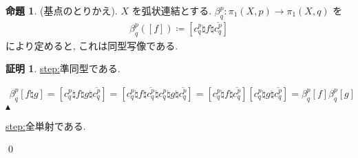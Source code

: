 \documentclass[10pt, fleqn, label-section=none]{bxjsarticle}
\theoremstyle{definition}
\newtheorem{prop}[dfn]{命題}
\newtheorem*{pf*}{証明}
\newcommand{\id}{\textrm{id}}
\renewcommand{\;}{\, ; \,}
\newenvironment{claim}[1]{\par\noindent\underline{step:}\space#1}{}
\newenvironment{claimproof}[1]{\par\noindent{($\because$)}\space#1}{\hfill $\blacktriangle $}
\begin{document}
\begin{prop}(基点のとりかえ). $X$ を弧状連結とする. $\beta_q^p : \pi_1 (X, p) \rightarrow \pi_1 (X, q)$ を
\begin{align*} \beta_q^p ([f]) \coloneqq [ c_q^p \natural f \natural \overline{c_q^p} ]\end{align*}
により定めると, これは同型写像である.
\end{prop}
\begin{pf*}

\begin{claim}
準同型である. 
\end{claim}
\begin{claimproof}
\begin{align*} \beta_q^p[f \natural g] = [ c_q^p \natural f \natural g \natural \overline{c_q^p} ] =
[ c_q^p \natural f \natural \overline{c_q^p} \natural c_q^p \natural g \natural \overline{c_q^p} ] =
[ c_q^p \natural f \natural \overline{c_q^p} ]  [c_q^p \natural g \natural \overline{c_q^p} ] = 
\beta_q^p [f ] \beta_q^p[g]
 \end{align*}
\end{claimproof}

\begin{claim}
全単射である. 
\end{claim}

\qed
\end{pf*}
\end{document}
